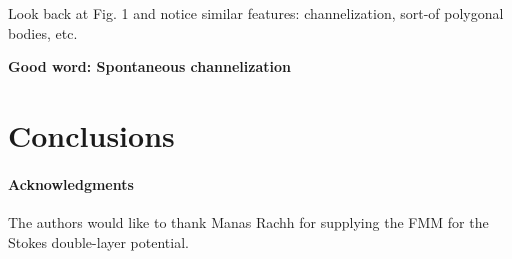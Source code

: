 \documentclass[preprint, 10pt]{elsarticle}
\begin{document}
Look back at Fig. 1 and notice similar features: channelization, sort-of polygonal bodies, etc.


{\bf Good word: Spontaneous channelization}



\section{Conclusions\label{s:conclusions}}


\paragraph{\bf Acknowledgments} The authors would like to thank Manas
Rachh for supplying the FMM for the Stokes double-layer potential.

 

\end{document}

